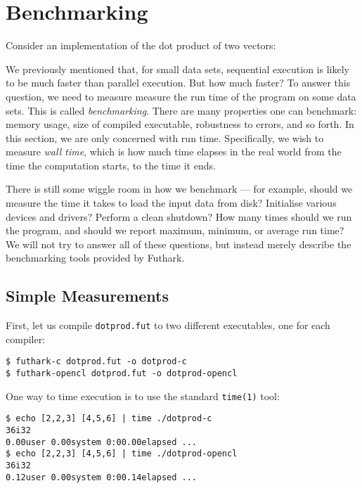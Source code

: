 \documentclass[oneside,11pt]{book}
\begin{document}
\section{Benchmarking}
\label{sec:benchmarking}

Consider an implementation of the dot product of two vectors:



We previously mentioned that, for small data sets, sequential
execution is likely to be much faster than parallel execution.  But
how much faster?  To answer this question, we need to measure measure
the run time of the program on some data sets.  This is called
\textit{benchmarking}.  There are many properties one can benchmark:
memory usage, size of compiled executable, robustness to errors, and
so forth.  In this section, we are only concerned with run time.
Specifically, we wish to measure \textit{wall time}, which is how much
time elapses in the real world from the time the computation starts,
to the time it ends.

There is still some wiggle room in how we benchmark --- for example,
should we measure the time it takes to load the input data from disk?
Initialise various devices and drivers?  Perform a clean shutdown?
How many times should we run the program, and should we report
maximum, minimum, or average run time?  We will not try to answer all
of these questions, but instead merely describe the benchmarking tools
provided by Futhark.

\subsection{Simple Measurements}

First, let us compile \texttt{dotprod.fut} to two different
executables, one for each compiler:

\begin{verbatim}
$ futhark-c dotprod.fut -o dotprod-c
$ futhark-opencl dotprod.fut -o dotprod-opencl
\end{verbatim}

One way to time execution is to use the standard \texttt{time(1)}
tool:

\begin{verbatim}
$ echo [2,2,3] [4,5,6] | time ./dotprod-c
36i32
0.00user 0.00system 0:00.00elapsed ...
$ echo [2,2,3] [4,5,6] | time ./dotprod-opencl
36i32
0.12user 0.00system 0:00.14elapsed ...
\end{verbatim}
\end{document}
